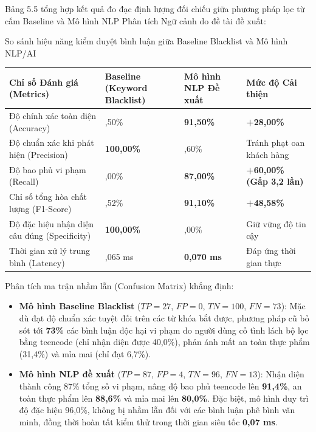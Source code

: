 \documentclass{uetgraduation}
\begin{document}
Bảng 5.5 tổng hợp kết quả đo đạc định lượng đối chiếu giữa phương pháp lọc từ cấm Baseline và Mô hình NLP Phân tích Ngữ cảnh do đề tài đề xuất:

\begin{table}[!htbp]{So sánh hiệu năng kiểm duyệt bình luận giữa Baseline Blacklist và Mô hình NLP/AI}
\centering
\small
\begin{tabularx}{\textwidth}{|>{\raggedright\arraybackslash}p{4.6cm}|>{\centering\arraybackslash}p{3.2cm}|>{\centering\arraybackslash}p{3.0cm}|>{\centering\arraybackslash}X|}
\hline
\textbf{Chỉ số Đánh giá (Metrics)} & \textbf{Baseline (Keyword Blacklist)} & \textbf{Mô hình NLP Đề xuất} & \textbf{Mức độ Cải thiện} \\ \hline
Độ chính xác toàn diện (Accuracy) & 63,50\% & \textbf{91,50\%} & \textbf{+28,00\%} \\ \hline
Độ chuẩn xác khi phát hiện (Precision) & \textbf{100,00\%} & 95,60\% & Tránh phạt oan khách hàng \\ \hline
Độ bao phủ vi phạm (Recall) & 27,00\% & \textbf{87,00\%} & \textbf{+60,00\% (Gấp 3,2 lần)} \\ \hline
Chỉ số tổng hòa chất lượng (F1-Score) & 42,52\% & \textbf{91,10\%} & \textbf{+48,58\%} \\ \hline
Độ đặc hiệu nhận diện câu đúng (Specificity) & \textbf{100,00\%} & 96,00\% & Giữ vững độ tin cậy \\ \hline
Thời gian xử lý trung bình (Latency) & 0,065 ms & \textbf{0,070 ms} & Đáp ứng thời gian thực \\ \hline
\end{tabularx}
\end{table}

Phân tích ma trận nhầm lẫn (Confusion Matrix) khẳng định:
\begin{itemize}
    \item \textbf{Mô hình Baseline Blacklist} ($TP = 27$, $FP = 0$, $TN = 100$, $FN = 73$): Mặc dù đạt độ chuẩn xác tuyệt đối trên các từ khóa bắt được, phương pháp cũ bỏ sót tới \textbf{73\%} các bình luận độc hại vi phạm do người dùng cố tình lách bộ lọc bằng teencode (chỉ nhận diện được 40,0\%), phản ánh mất an toàn thực phẩm (31,4\%) và mỉa mai (chỉ đạt 6,7\%).
    \item \textbf{Mô hình NLP đề xuất} ($TP = 87$, $FP = 4$, $TN = 96$, $FN = 13$): Nhận diện thành công 87\% tổng số vi phạm, nâng độ bao phủ teencode lên \textbf{91,4\%}, an toàn thực phẩm lên \textbf{88,6\%} và mỉa mai lên \textbf{80,0\%}. Đặc biệt, mô hình duy trì độ đặc hiệu 96,0\%, không bị nhầm lẫn đối với các bình luận phê bình văn minh, đồng thời hoàn tất kiểm thử trong thời gian siêu tốc \textbf{0,07 ms}.
\end{itemize}
\end{document}
